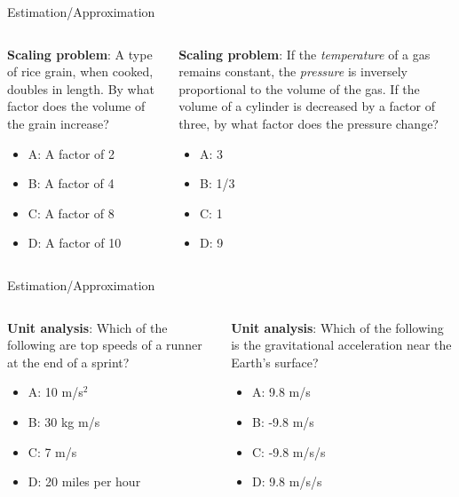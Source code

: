 \documentclass{beamer}
\begin{document}
\begin{frame}{Estimation/Approximation}
\small
\begin{columns}[T]
\begin{column}{0.5\textwidth}
\textbf{Scaling problem}: A type of rice grain, when cooked, doubles in length.  By what factor does the volume of the grain increase?
\begin{itemize}
\item A: A factor of 2
\item B: A factor of 4
\item C: A factor of 8
\item D: A factor of 10
\end{itemize}
\end{column}
\begin{column}{0.5\textwidth}
\textbf{Scaling problem}: If the \textit{temperature} of a gas remains constant, the \textit{pressure} is inversely proportional to the volume of the gas.  If the volume of a cylinder is decreased by a factor of three, by what factor does the pressure change?
\vspace{0.55cm}
\begin{itemize}
\item A: 3
\item B: 1/3
\item C: 1
\item D: 9
\end{itemize}
\end{column}
\end{columns}
\end{frame}

\begin{frame}{Estimation/Approximation}
\small
\begin{columns}[T]
\begin{column}{0.5\textwidth}
\textbf{Unit analysis}: Which of the following are top speeds of a runner at the end of a sprint?
\begin{itemize}
\item A: 10 m/s$^2$
\item B: 30 kg m/s
\item C: 7 m/s
\item D: 20 miles per hour
\end{itemize}
\end{column}
\begin{column}{0.5\textwidth}
\textbf{Unit analysis}: Which of the following is the gravitational acceleration near the Earth's surface?
\vspace{0.55cm}
\begin{itemize}
\item A: 9.8 m/s
\item B: -9.8 m/s
\item C: -9.8 m/s/s
\item D: 9.8 m/s/s
\end{itemize}
\end{column}
\end{columns}
\end{frame}
\end{document}
